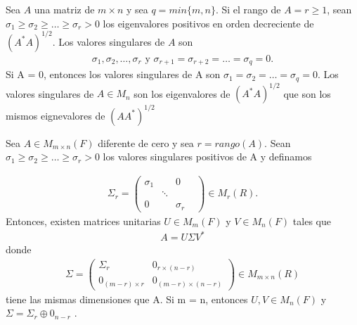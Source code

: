 \begin{definition}
Sea $A$ una matriz de $m \times n$ y sea $q = min \{m, n \}$. Si el rango de $A = r \geq 1$, sean $\sigma_1 \geq \sigma_2 \geq \dots \geq \sigma_r > 0$ los eigenvalores positivos en orden decreciente de $(A^{*}A)^{1/2}$. Los valores singulares de $A$ son
\begin{equation*}
    \begin{aligned}
    \sigma_1, \sigma_2, \dots, \sigma_r \text{ y } \sigma_{r+1} = \sigma_{r+2} = \dots = \sigma_q = 0.
    \end{aligned}
\end{equation*}
Si A = 0, entonces los valores singulares de A son $\sigma_1 = \sigma_2 = \dots = \sigma_q = 0$. 
Los valores singulares de $A \in M_{n}$ son los eigenvalores de $(A^{*}A)^{1/2}$ que son los mismos eignevalores de $(AA^{*})^{1/2}$
\cite[p.~420]{garcia2017second}
\end{definition}


\begin{theorem}
Sea $A \in M_{m \times n} (F)$ diferente de cero y sea $r =   rango(A)$. Sean $\sigma_1 \geq \sigma_2 \geq \dots \geq \sigma_r > 0$ los valores singulares positivos de A y definamos

\begin{equation*}
    \begin{aligned}
    \Sigma_r = 
    \begin{pmatrix}
    \sigma_1 & & 0 \\
     & \ddots & & \\
     0 & & \sigma_r
    \end{pmatrix}
    \in M_{r}(R).
    \end{aligned}
\end{equation*}
Entonces, existen matrices unitarias $U \in M_{m}(F)$ y $V \in M_{n}(F)$ tales que 
\begin{equation} \label{decomposicion}
    \begin{aligned}
    A = U \Sigma V^{*}
    \end{aligned}
\end{equation}
donde
\begin{equation*}
    \begin{aligned}
    \Sigma = 
    \begin{pmatrix}
    \Sigma_r & 0_{r \times (n-r)} \\
    0_{(m-r) \times r} & 0_{(m-r) \times (n-r)}
    \end{pmatrix}
    \in M_{m \times n}(R)
    \end{aligned}
\end{equation*}
 tiene las mismas dimensiones que A. Si m = n, entonces $U, V \in M_{n}(F)$ y $\Sigma = \Sigma_r \oplus 0_{n-r}$
 \cite[p.~421]{garcia2017second}.
\end{theorem}

